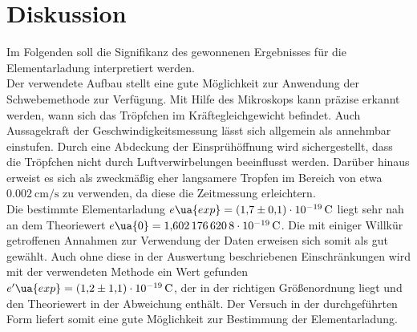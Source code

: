 \section{Diskussion}
Im Folgenden soll die Signifikanz des gewonnenen Ergebnisses für die Elementarladung interpretiert werden. \\
Der verwendete Aufbau stellt eine gute Möglichkeit zur Anwendung der Schwebemethode zur Verfügung. Mit Hilfe des Mikroskops
kann präzise erkannt werden, wann sich das Tröpfchen im Kräftegleichgewicht befindet. Auch Aussagekraft der Geschwindigkeitsmessung lässt
sich allgemein als annehmbar einstufen. Durch eine Abdeckung der Einsprühöffnung wird sichergestellt, dass die
Tröpfchen nicht durch Luftverwirbelungen beeinflusst werden. Darüber hinaus erweist es sich als zweckmäßig eher langsamere Tropfen
im Bereich von etwa $\SI{0.002}{\centi\meter \per \second}$ zu verwenden, da diese die Zeitmessung erleichtern. \\
Die bestimmte Elementarladung $e\ua{exp} = \SI{+1.7(1)e-19}{\coulomb}$ liegt sehr nah an dem Theoriewert
$e\ua{0} = \SI{1.6021766208e-19}{\coulomb}$. Die mit einiger Willkür getroffenen Annahmen zur Verwendung der Daten erweisen sich
somit als gut gewählt. Auch ohne diese in der Auswertung beschriebenen Einschränkungen wird mit der verwendeten Methode ein Wert gefunden
$e'\ua{exp} = \SI{+1.2(11)e-19}{\coulomb}$, der in der richtigen Größenordnung liegt und den Theoriewert in der Abweichung enthält.
Der Versuch in der durchgeführten Form liefert somit eine gute Möglichkeit zur Bestimmung der Elementarladung.
